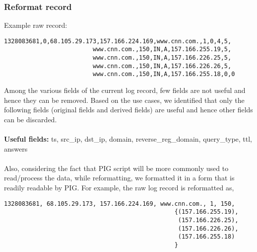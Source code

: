\documentclass[11pt,a4paper]{article}
\begin{document}
\subsubsection{Reformat record}
Example raw record:
\begin{verbatim}
1328083681,0,68.105.29.173,157.166.224.169,www.cnn.com.,1,0,4,5,
                         www.cnn.com.,150,IN,A,157.166.255.19,5,
                         www.cnn.com.,150,IN,A,157.166.226.25,5,
                         www.cnn.com.,150,IN,A,157.166.226.26,5,
                         www.cnn.com.,150,IN,A,157.166.255.18,0,0
\end{verbatim}
Among the various fields of the current log record, few fields are not useful and hence they can be removed. Based on the use cases, we identified that only the following fields (original fields and derived fields) are useful and hence other fields can be discarded.
\\\\
\textbf{Useful fields:} ts, src\_ip, dst\_ip, domain, reverse\_reg\_domain, query\_type, ttl, answers
\\\\
Also, considering the fact that PIG script will be more commonly used to read/process the data, while reformatting, we formatted it in a form that is readily readable by PIG.
\newpage
\noindent
For example, the raw log record is reformatted as,
\begin{verbatim}
1328083681, 68.105.29.173, 157.166.224.169, www.cnn.com., 1, 150, 
                                                {(157.166.255.19),
                                                 (157.166.226.25),
                                                 (157.166.226.26),
                                                 (157.166.255.18)
                                                }
\end{verbatim}
\end{document}
